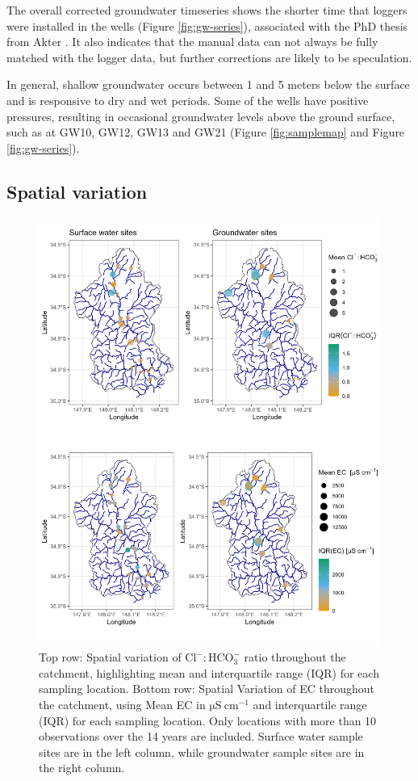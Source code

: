 \documentclass[, manuscript]{copernicus}
\begin{document}
The overall corrected groundwater timeseries shows the shorter time that
loggers were installed in the wells (Figure \ref{fig:gw-series}),
associated with the PhD thesis from Akter \citeyearpar{Akter2018}. It
also indicates that the manual data can not always be fully matched with
the logger data, but further corrections are likely to be speculation.

In general, shallow groundwater occurs between 1 and 5 meters below the
surface and is responsive to dry and wet periods. Some of the wells have
positive pressures, resulting in occasional groundwater levels above the
ground surface, such as at GW10, GW12, GW13 and GW21 (Figure
\ref{fig:samplemap} and Figure \ref{fig:gw-series}).

\subsection{Spatial variation}

\clearpage

\begin{figure}
\includegraphics[width=0.8\linewidth]{Figures/spatial_maps} \caption{Top row: Spatial variation of $\mathrm{Cl^-:HCO_3^-}$ ratio throughout the catchment, highlighting mean and interquartile range (IQR) for each sampling location. Bottom row: Spatial Variation of EC throughout the catchment, using Mean EC in $\mathrm{\mu S~cm^{-1}}$ and interquartile range (IQR) for each sampling location. Only locations with more than 10 observations over the 14 years are included. Surface water sample sites are in the left column, while groundwater sample sites are in the right column.}\label{fig:spatial-map}
\end{figure}
\end{document}
